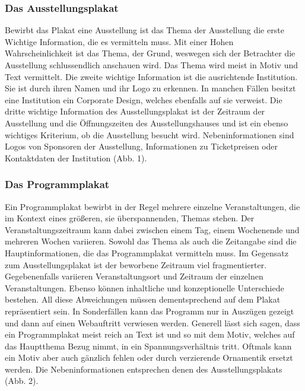 \documentclass[a4paper,12pt,ngerman]{article}
\begin{document}
\subsubsection{Das Ausstellungsplakat}
Bewirbt das Plakat eine Ausstellung ist das Thema der Ausstellung die erste Wichtige Information, die es vermitteln muss. Mit einer Hohen Wahrscheinlichkeit ist das Thema, der Grund, weswegen sich der Betrachter die Ausstellung schlussendlich anschauen wird. Das Thema wird meist in Motiv und Text vermittelt. Die zweite wichtige Information ist die ausrichtende Institution. Sie ist durch ihren Namen und ihr Logo zu erkennen. In manchen Fällen besitzt eine Institution ein Corporate Design, welches ebenfalls auf sie verweist. Die dritte wichtige Information des Ausstellungsplakat ist der Zeitraum der Ausstellung und die Öffnungszeiten des Ausstellungshauses und ist ein ebenso wichtiges Kriterium, ob die Ausstellung besucht wird. Nebeninformationen sind Logos von Sponsoren der Ausstellung, Informationen zu Ticketpreisen oder Kontaktdaten der Institution (Abb. 1). \\

\subsubsection{Das Programmplakat}
Ein Programmplakat bewirbt in der Regel mehrere einzelne Veranstaltungen, die im Kontext eines größeren, sie überspannenden, Themas stehen. Der Veranstaltungszeitraum kann dabei zwischen einem Tag, einem Wochenende und mehreren Wochen variieren. Sowohl das Thema als auch die Zeitangabe sind die Hauptinformationen, die das Programmplakat vermitteln muss. Im Gegensatz zum Ausstellungsplakat ist der beworbene Zeitraum viel fragmentierter. Gegebenenfalls variieren Veranstaltungsort und Zeitraum der einzelnen Veranstaltungen. Ebenso können inhaltliche und konzeptionelle Unterschiede bestehen. All diese Abweichungen müssen dementsprechend auf dem Plakat repräsentiert sein. In Sonderfällen kann das Programm nur in Auszügen gezeigt und dann auf einen Webauftritt verwiesen werden. Generell lässt sich sagen, dass ein Programmplakat meist reich an Text ist und so mit dem Motiv, welches auf das Hauptthema Bezug nimmt, in ein Spannungsverhältnis tritt. Oftmals kann ein Motiv aber auch gänzlich fehlen oder durch verzierende Ornamentik ersetzt werden. Die Nebeninformationen entsprechen denen des Ausstellungsplakats (Abb. 2). \\
\end{document}

